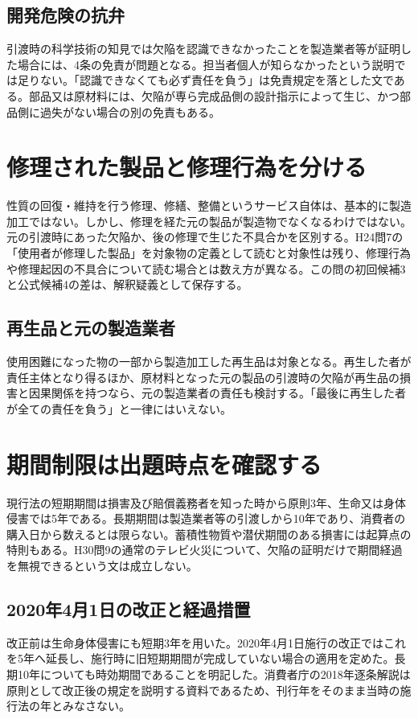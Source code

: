 \subsection{開発危険の抗弁}
\label{theory:pl:development}
引渡時の科学技術の知見では欠陥を認識できなかったことを製造業者等が証明した場合には、4条の免責が問題となる。担当者個人が知らなかったという説明では足りない。「認識できなくても必ず責任を負う」は免責規定を落とした文である。部品又は原材料には、欠陥が専ら完成品側の設計指示によって生じ、かつ部品側に過失がない場合の別の免責もある。

\section{修理された製品と修理行為を分ける}
\label{theory:pl:repair}
性質の回復・維持を行う修理、修繕、整備というサービス自体は、基本的に製造加工ではない。しかし、修理を経た元の製品が製造物でなくなるわけではない。元の引渡時にあった欠陥か、後の修理で生じた不具合かを区別する。H24問7の「使用者が修理した製品」を対象物の定義として読むと対象性は残り、修理行為や修理起因の不具合について読む場合とは数え方が異なる。この問の初回候補3と公式候補4の差は、解釈疑義として保存する。\autocite{pl_qa,pl_definitions2018}

\subsection{再生品と元の製造業者}
\label{theory:pl:recycle}
使用困難になった物の一部から製造加工した再生品は対象となる。再生した者が責任主体となり得るほか、原材料となった元の製品の引渡時の欠陥が再生品の損害と因果関係を持つなら、元の製造業者の責任も検討する。「最後に再生した者が全ての責任を負う」と一律にはいえない。\autocite{pl_definitions2018}

\section{期間制限は出題時点を確認する}
\label{theory:pl:time}
現行法の短期期間は損害及び賠償義務者を知った時から原則3年、生命又は身体侵害では5年である。長期期間は製造業者等の引渡しから10年であり、消費者の購入日から数えるとは限らない。蓄積性物質や潜伏期間のある損害には起算点の特則もある。H30問9の通常のテレビ火災について、欠陥の証明だけで期間経過を無視できるという文は成立しない。\autocite{pl_statute,pl_qa}

\subsection{2020年4月1日の改正と経過措置}
\label{theory:pl:transition}
改正前は生命身体侵害にも短期3年を用いた。2020年4月1日施行の改正ではこれを5年へ延長し、施行時に旧短期期間が完成していない場合の適用を定めた。長期10年についても時効期間であることを明記した。消費者庁の2018年逐条解説は原則として改正後の規定を説明する資料であるため、刊行年をそのまま当時の施行法の年とみなさない。\autocite{pl_transition2020,pl_time2018}

